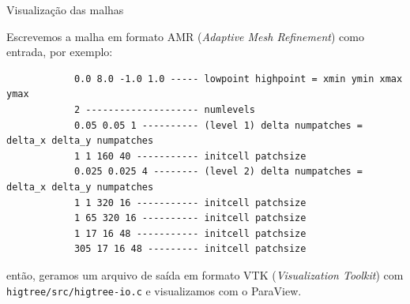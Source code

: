\documentclass[../main/main.tex]{subfiles}
\begin{document}
\begin{frame}[fragile]{\smaller \smaller Visualização das malhas}
	
	\smaller
	Escrevemos a malha em formato AMR (\textit{Adaptive Mesh Refinement}) como entrada, por exemplo:
	
	{\scriptsize
		\begin{verbatim}
			0.0 8.0 -1.0 1.0 ----- lowpoint highpoint = xmin ymin xmax ymax
			2 -------------------- numlevels
			0.05 0.05 1 ---------- (level 1) delta numpatches = delta_x delta_y numpatches
			1 1 160 40 ----------- initcell patchsize
			0.025 0.025 4 -------- (level 2) delta numpatches = delta_x delta_y numpatches
			1 1 320 16 ----------- initcell patchsize
			1 65 320 16 ---------- initcell patchsize
			1 17 16 48 ----------- initcell patchsize
			305 17 16 48 --------- initcell patchsize
		\end{verbatim}
	}
	
	então, geramos um arquivo de saída em formato VTK (\textit{Visualization Toolkit}) com \texttt{higtree/src/higtree-io.c} e visualizamos com o ParaView.
\end{frame}
\end{document}
